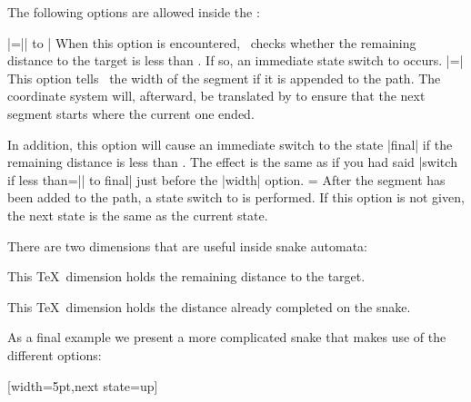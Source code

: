 \begin{command}{\pgfdeclaresnake{}}
\begin{command}{\state{}}
    The following options are allowed inside the :
    \begin{itemize}
      |=|| to |
      When this option is encountered, \pgfname\ checks whether the
      remaining distance to the target is less than
      . If so, an immediate state switch to  occurs.
      |=|
      This option tells \pgfname\ the width of the segment if it is
      appended to the path. The coordinate system will, afterward, be
      translated by  to ensure that the next segment
      starts where the current one ended.

      In addition, this option will cause an immediate switch to the
      state |final| if the remaining distance is less than
      . The effect is the same as if you had said
      |switch if less than=|| to final| just before
      the |width| option.
      =
      After the segment has been added to the path, a state switch to
       is performed. If this option is not given, the
      next state is the same as the current state.
    \end{itemize}

    There are two dimensions that are useful inside snake automata:
    \begin{command}{\pgfsnakeremainingdistance}
      This \TeX\ dimension holds the remaining distance to the target.
    \end{command}
    \begin{command}{\pgfsnakecompleteddistance}
      This \TeX\ dimension holds the distance already completed on the
      snake. 
    \end{command}
  \end{command}

  As a final example we present a more complicated snake that makes
  use of the different options:
\begin{codeexample}[]
{
  [width=5pt,next state=up]
  { \pgfpathlineto{\pgfpoint{5pt}{0pt}} }
  
}
\end{codeexample}
\end{command}
